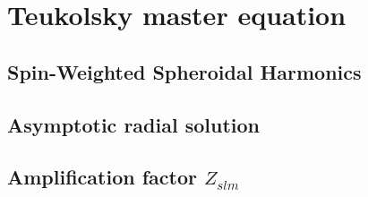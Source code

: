 
\chapter{Teukolsky master equation} %
\label{Chapter3}


\section{Spin-Weighted Spheroidal Harmonics}

\section{Asymptotic radial solution}

\section{Amplification factor $Z_{slm}$}


\cleardoublepage